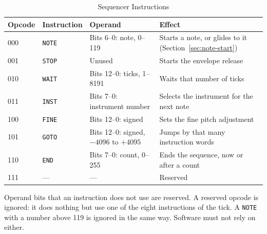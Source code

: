 \begin{table}[H]
	\centering
	\begin{tabular}{lllp{5.1cm}}
		\toprule
		\textbf{Opcode} & \textbf{Instruction} & \textbf{Operand}                       & \textbf{Effect}                                               \\
		\midrule
		000             & \texttt{NOTE}        & Bits 6--0: note, 0--119                & Starts a note, or glides to it (Section~\ref{sec:note-start}) \\
		001             & \texttt{STOP}        & Unused                                 & Starts the envelope release                                   \\
		010             & \texttt{WAIT}        & Bits 12--0: ticks, 1--8191             & Waits that number of ticks                                    \\
		011             & \texttt{INST}        & Bits 7--0: instrument number           & Selects the instrument for the next note                      \\
		100             & \texttt{FINE}        & Bits 12--0: signed                     & Sets the fine pitch adjustment                                \\
		101             & \texttt{GOTO}        & Bits 12--0: signed, $-4096$ to $+4095$ & Jumps by that many instruction words                          \\
		110             & \texttt{END}         & Bits 7--0: count, 0--255               & Ends the sequence, now or after a count                       \\
		111             & ---                  & ---                                    & Reserved                                                      \\
		\bottomrule
	\end{tabular}
	\caption{Sequencer Instructions}
	\label{tab:seq-instructions}
\end{table}

Operand bits that an instruction does not use are reserved. A reserved opcode is ignored: it does nothing but use one
of the eight instructions of the tick. A \texttt{NOTE} with a number above 119 is ignored in the same way. Software
must not rely on either.


